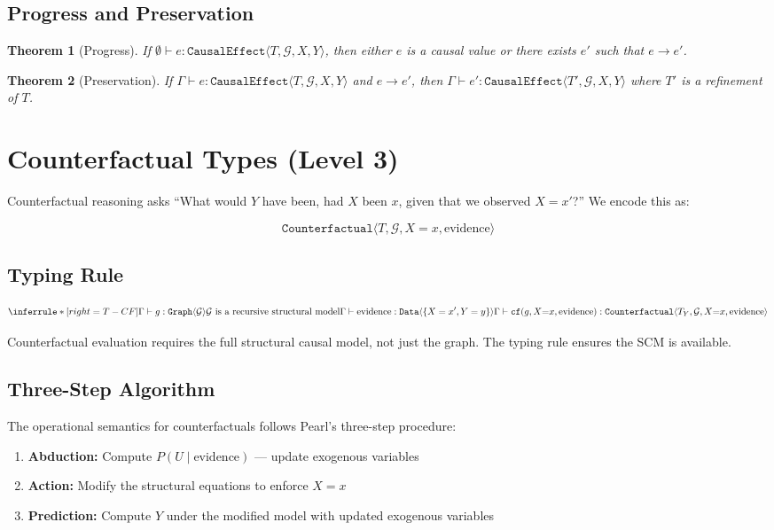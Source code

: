 \documentclass[11pt]{article}
\newtheorem{theorem}{Theorem}
\begin{document}
\subsection{Progress and Preservation}

\begin{theorem}[Progress]
If $\emptyset \vdash e : \texttt{CausalEffect}\langle T, \mathcal{G}, X, Y \rangle$, then either $e$ is a causal value or there exists $e'$ such that $e \longrightarrow e'$.
\end{theorem}

\begin{theorem}[Preservation]
If $\Gamma \vdash e : \texttt{CausalEffect}\langle T, \mathcal{G}, X, Y \rangle$ and $e \longrightarrow e'$, then $\Gamma \vdash e' : \texttt{CausalEffect}\langle T', \mathcal{G}, X, Y \rangle$ where $T'$ is a refinement of $T$.
\end{theorem}

\section{Counterfactual Types (Level 3)}

Counterfactual reasoning asks ``What would $Y$ have been, had $X$ been $x$, given that we observed $X = x'$?'' We encode this as:

\[
\texttt{Counterfactual}\langle T, \mathcal{G}, X{=}x, \text{evidence} \rangle
\]

\subsection{Typing Rule}
\[
\inferrule*[right=T-CF]
  {\Gamma \vdash g : \texttt{Graph}\langle \mathcal{G} \rangle \\
   \mathcal{G} \text{ is a recursive structural model} \\
   \Gamma \vdash \text{evidence} : \texttt{Data}\langle \{X = x', Y = y\} \rangle}
  {\Gamma \vdash \texttt{cf}(g, X{=}x, \text{evidence}) : \texttt{Counterfactual}\langle T_Y, \mathcal{G}, X{=}x, \text{evidence} \rangle}
\]

\noindent Counterfactual evaluation requires the full structural causal model, not just the graph. The typing rule ensures the SCM is available.

\subsection{Three-Step Algorithm}
The operational semantics for counterfactuals follows Pearl's three-step procedure:
\begin{enumerate}
\item \textbf{Abduction:} Compute $P(U \mid \text{evidence})$ — update exogenous variables
\item \textbf{Action:} Modify the structural equations to enforce $X = x$
\item \textbf{Prediction:} Compute $Y$ under the modified model with updated exogenous variables
\end{enumerate}
\end{document}
